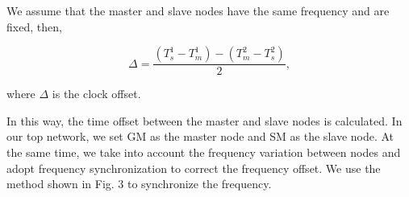\documentclass[conference]{IEEEtran}
\begin{document}
We assume that the master and slave nodes have the same frequency and are fixed, then,






\begin{equation}
\Delta  = \frac{{(T_s^1 - T_m^1) - (T_m^2 - T_s^2)}}{2}, \label{eq3}
\end{equation}

\noindent where $ \Delta $ is the clock offset.

In this way, the time offset between the master and slave nodes is calculated. In our top network, we set GM as the master node and SM as the slave node. At the same time, we take into account the frequency variation between nodes and adopt frequency synchronization to correct the frequency offset. We use the method shown in Fig. 3 to synchronize the frequency.

\end{document}
